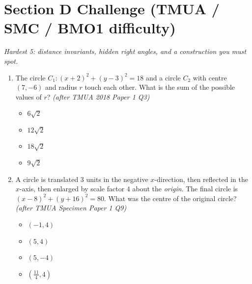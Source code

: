 \documentclass[11pt,a4paper]{article}
\begin{document}
\section*{Section D \quad Challenge \hfill{\normalfont\small(TMUA / SMC / BMO1 difficulty)}}

\noindent\textit{Hardest 5: distance invariants, hidden right angles, and a construction you must spot.}

\begin{enumerate}

\item The circle $C_1:(x+2)^2+(y-3)^2=18$ and a circle $C_2$ with centre $(7,-6)$ and radius $r$ touch each other. What is the sum of the possible values of $r$? \textit{\small(after TMUA 2018 Paper 1 Q3)}
\begin{itemize}
\item[A)] $6\sqrt2$
\item[B)] $12\sqrt2$
\item[C)] $18\sqrt2$
\item[D)] $9\sqrt2$
\end{itemize}


\item A circle is translated $3$ units in the negative $x$-direction, then reflected in the $x$-axis, then enlarged by scale factor $4$ about the \emph{origin}. The final circle is $(x-8)^2+(y+16)^2=80$. What was the centre of the original circle? \textit{\small(after TMUA Specimen Paper 1 Q9)}
\begin{itemize}
\item[A)] $(-1,4)$
\item[B)] $(5,4)$
\item[C)] $(5,-4)$
\item[D)] $(\tfrac{11}{4},4)$
\end{itemize}


\end{enumerate}
\end{document}
